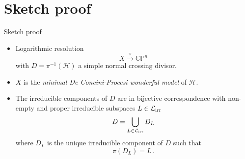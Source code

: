 \documentclass{beamer}
\newcommand{\CP}{\mathbb{CP}}
\newcommand{\mH}{\mathcal{H}}
\newcommand{\mLi}{\mathcal{L}_{\textup{irr}}}
\begin{document}
\section{Sketch proof}
\begin{frame}{Sketch proof}
	\begin{itemize}
		\item Logarithmic resolution
		\[
		X \xrightarrow{\pi} \CP^n
		\]
		with \(D = \pi^{-1}(\mH)\) a simple normal crossing divisor.
		
		\item \(X\) is the \emph{minimal De Concini-Procesi wonderful model} of \(\mH\). 
		
		\item The irreducible components of \(D\) are in bijective correspondence with non-empty and proper irreducible subspaces \(L \in \mLi\) 
		\[
		D = \bigcup_{L \in \mLi} D_L
		\]
		where \(D_L\) is the unique irreducible component of \(D\) such that 
		\[
		\pi(D_L) = L \,.
		\]
		
	\end{itemize}
\end{frame}
\end{document}
